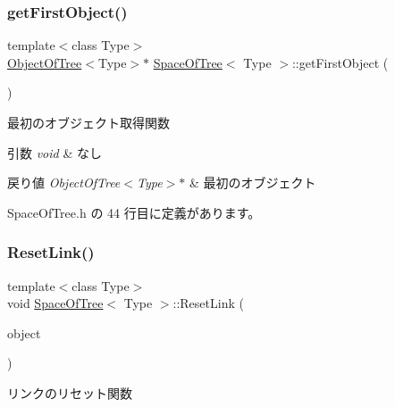 \subsubsection{\texorpdfstring{get\+First\+Object()}{getFirstObject()}}
{\footnotesize\ttfamily template$<$class Type$>$ \\
\mbox{\hyperlink{class_object_of_tree}{Object\+Of\+Tree}}$<$Type$>$$\ast$ \mbox{\hyperlink{class_space_of_tree}{Space\+Of\+Tree}}$<$ Type $>$\+::get\+First\+Object (\begin{DoxyParamCaption}{ }\end{DoxyParamCaption})\hspace{0.3cm}{\ttfamily [inline]}}



最初のオブジェクト取得関数 


\begin{DoxyParams}{引数}
{\em void} & なし \\
\hline
\end{DoxyParams}

\begin{DoxyRetVals}{戻り値}
{\em Object\+Of\+Tree$<$\+Type$>$$\ast$} & 最初のオブジェクト \\
\hline
\end{DoxyRetVals}


 Space\+Of\+Tree.\+h の 44 行目に定義があります。

\mbox{\label{class_space_of_tree_a3231408434cb3066768cfd9d33d86190}} 
\subsubsection{\texorpdfstring{Reset\+Link()}{ResetLink()}}
{\footnotesize\ttfamily template$<$class Type$>$ \\
void \mbox{\hyperlink{class_space_of_tree}{Space\+Of\+Tree}}$<$ Type $>$\+::Reset\+Link (\begin{DoxyParamCaption}\item[{\mbox{\hyperlink{class_object_of_tree}{Object\+Of\+Tree}}$<$ Type $>$ $\ast$$\ast$}]{object }\end{DoxyParamCaption})\hspace{0.3cm}{\ttfamily [inline]}}



リンクのリセット関数 


